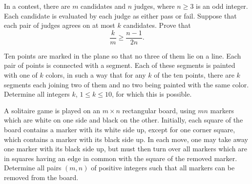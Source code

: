 \item[\textbf{C5.}]In a contest, there are $m$ candidates and $n$ judges, where $n\geq 3$ is an odd integer. Each candidate is evaluated by each judge as either pass or fail. Suppose that each pair of judges agrees on at most $k$ candidates. Prove that \[{\frac{k}{m}} \geq {\frac{n-1}{2n}}. \]

\item[\textbf{C6.}]Ten points are marked in the plane so that no three of them lie on a line. Each pair of points is connected with a segment. Each of these segments is painted with one of $k$ colors, in such a way that for any $k$ of the ten points, there are $k$ segments each joining two of them and no two being painted with the same color. Determine all integers $k$,  $1\leq k\leq 10$,  for which this is possible.

\item[\textbf{C7.}]A solitaire game is played on an $m\times n$ rectangular board, using $mn$ markers which are white on one side and black on the other. Initially, each  square of the board contains a marker with its white side up, except for one corner square, which contains a marker with its black side up. In each move, one may take away one marker with its black side up, but must then turn over  all markers which are in squares having an edge in common with the square of the removed marker. Determine all pairs $(m,n)$ of positive integers such that all markers can be removed from the board.